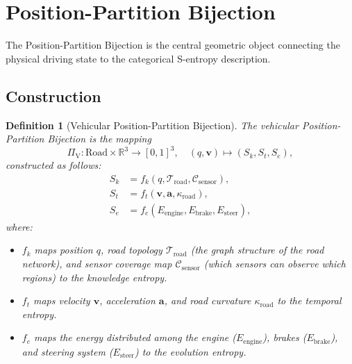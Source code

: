 \documentclass[twocolumn,10pt]{article}
\newtheorem{definition}[theorem]{Definition}
\newcommand{\PiV}{\Pi_{\mathrm{V}}}
\newcommand{\Sk}{S_k}
\newcommand{\St}{S_t}
\newcommand{\Se}{S_e}
\begin{document}
\section{Position-Partition Bijection}\label{sec:bijection}

The Position-Partition Bijection is the central geometric object connecting the physical driving state to the categorical S-entropy description.

\subsection{Construction}

\begin{definition}[Vehicular Position-Partition Bijection]\label{def:PiV}
The vehicular Position-Partition Bijection is the mapping
\begin{equation}
\PiV : \mathrm{Road} \times \mathbb{R}^3 \to [0,1]^3, \quad (q, \mathbf{v}) \mapsto (\Sk, \St, \Se),
\end{equation}
constructed as follows:
\begin{align}
\Sk &= f_k(q, \mathcal{T}_{\mathrm{road}}, \mathcal{C}_{\mathrm{sensor}}), \label{eq:fk}\\
\St &= f_t(\mathbf{v}, \mathbf{a}, \kappa_{\mathrm{road}}), \label{eq:ft}\\
\Se &= f_e(E_{\mathrm{engine}}, E_{\mathrm{brake}}, E_{\mathrm{steer}}), \label{eq:fe}
\end{align}
where:
\begin{itemize}
    \item $f_k$ maps position $q$, road topology $\mathcal{T}_{\mathrm{road}}$ (the graph structure of the road network), and sensor coverage map $\mathcal{C}_{\mathrm{sensor}}$ (which sensors can observe which regions) to the knowledge entropy.
    \item $f_t$ maps velocity $\mathbf{v}$, acceleration $\mathbf{a}$, and road curvature $\kappa_{\mathrm{road}}$ to the temporal entropy.
    \item $f_e$ maps the energy distributed among the engine ($E_{\mathrm{engine}}$), brakes ($E_{\mathrm{brake}}$), and steering system ($E_{\mathrm{steer}}$) to the evolution entropy.
\end{itemize}
\end{definition}
\end{document}
